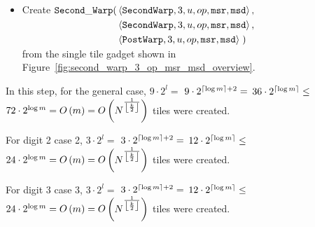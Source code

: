 \begin{itemize}
\begin{itemize}
        \item Create
        $\begin{aligned}[t]
            \secondwarp(& \left\langle {\tt SecondWarp}, 3, u, \inc, {\tt msr}, {\tt msd} \right\rangle, \\ %
                        & \left\langle {\tt SecondWarp}, 3, u, \inc, {\tt msr}, {\tt msd} \right\rangle, \\ %
                        & \left\langle {\tt PostWarp},   3, u, \inc, {\tt msr}, {\tt msd} \right\rangle \;) %
        \end{aligned}$\\ from the single tile gadget shown in Figure~\ref{fig:second_warp_3_op_msr_msd_overview}.
    \end{itemize}

    In this step, for the general case,
    $9 \cdot 2^l =$
    $9 \cdot 2^{\ceil*{{\log m}} + 2} =$
    $36 \cdot 2^{\ceil*{\log m}} \leq$
    $72 \cdot 2^{\log m} = \bigom$ tiles were created.

    For digit 2 case 2,
    $3 \cdot 2^l =$
    $3 \cdot 2^{\ceil*{{\log m}} + 2} =$
    $12 \cdot 2^{\ceil*{\log m}} \leq$
    $24 \cdot 2^{\log m} = \bigom$ tiles were created.

    For digit 3 case 3,
    $3 \cdot 2^l =$
    $3 \cdot 2^{\ceil*{{\log m}} + 2} =$
    $12 \cdot 2^{\ceil*{\log m}} \leq$
    $24 \cdot 2^{\log m} = \bigom$ tiles were created.


\end{itemize}
